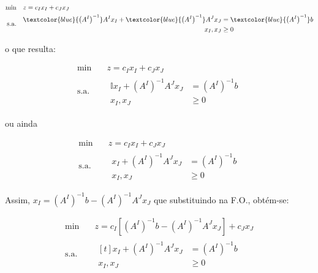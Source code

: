 \begin{align*}
  \min \quad        & z = c_Ix_I + c_Jx_J \\
  \text{s.a.} \quad &
                      \begin{aligned}
                        \textcolor{blue}{\left( A^{I} \right)^{-1}}A^{I} x_I + \textcolor{blue}{\left( A^{I} \right)^{-1}}A^{J}x_J &= \textcolor{blue}{\left( A^{I} \right)^{-1}}b \\
                        x_I, x_J &\geq 0
                      \end{aligned}
\end{align*}

o que resulta:

\begin{align*}
  \min \quad        & z = c_Ix_I + c_Jx_J \\
  \text{s.a.} \quad &
                      \begin{aligned}
                        \mathbb{I} x_I + \left( A^{I} \right)^{-1}A^{J}x_J &= \left( A^{I} \right)^{-1}b \\
                        x_I, x_J &\geq 0
                      \end{aligned}
\end{align*}

ou ainda

\begin{align*}
  \min \quad        & z = c_Ix_I + c_Jx_J \\
  \text{s.a.} \quad &
                      \begin{aligned}
                        x_I + \left( A^{I} \right)^{-1}A^{J}x_J &= \left( A^{I} \right)^{-1}b \\
                        x_I, x_J &\geq 0
                      \end{aligned}
\end{align*}

Assim, $ x_I =  \left( A^{I} \right)^{-1} b - \left( A^{I} \right)^{-1} A^{J} x_J $
que substituindo na F.O., obtém-se:

\begin{align*}
  \min \quad        & z = c_I\left[\left( A^{I} \right)^{-1} b - \left( A^{I} \right)^{-1} A^{J} x_J\right] + c_Jx_J \\
  \text{s.a.} \quad &
                      \begin{aligned}[t]
                        x_I + \left( A^{I} \right)^{-1}A^{J}x_J &= \left( A^{I} \right)^{-1}b \\
                        x_I, x_J &\geq 0
                      \end{aligned}
\end{align*}


